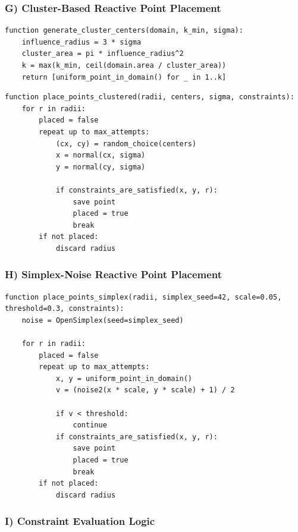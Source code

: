 ﻿\documentclass[11pt,a4paper]{article}
\begin{document}
\subsubsection*{G) Cluster-Based Reactive Point Placement}

\begin{lstlisting}[style=pseudo]
function generate_cluster_centers(domain, k_min, sigma):
	influence_radius = 3 * sigma
	cluster_area = pi * influence_radius^2
	k = max(k_min, ceil(domain.area / cluster_area))
	return [uniform_point_in_domain() for _ in 1..k]
\end{lstlisting}


\begin{lstlisting}[style=pseudo]
function place_points_clustered(radii, centers, sigma, constraints):
	for r in radii:
		placed = false
		repeat up to max_attempts:
			(cx, cy) = random_choice(centers)
			x = normal(cx, sigma)
			y = normal(cy, sigma)

			if constraints_are_satisfied(x, y, r):
				save point
				placed = true
				break
		if not placed:
			discard radius
\end{lstlisting}


\subsubsection*{H) Simplex-Noise Reactive Point Placement}

\begin{lstlisting}[style=pseudo]
function place_points_simplex(radii, simplex_seed=42, scale=0.05, threshold=0.3, constraints):
	noise = OpenSimplex(seed=simplex_seed)

	for r in radii:
		placed = false
		repeat up to max_attempts:
			x, y = uniform_point_in_domain()
			v = (noise2(x * scale, y * scale) + 1) / 2

			if v < threshold:
				continue
			if constraints_are_satisfied(x, y, r):
				save point
				placed = true
				break
		if not placed:
			discard radius
\end{lstlisting}


\subsubsection*{I) Constraint Evaluation Logic}
\end{document}
